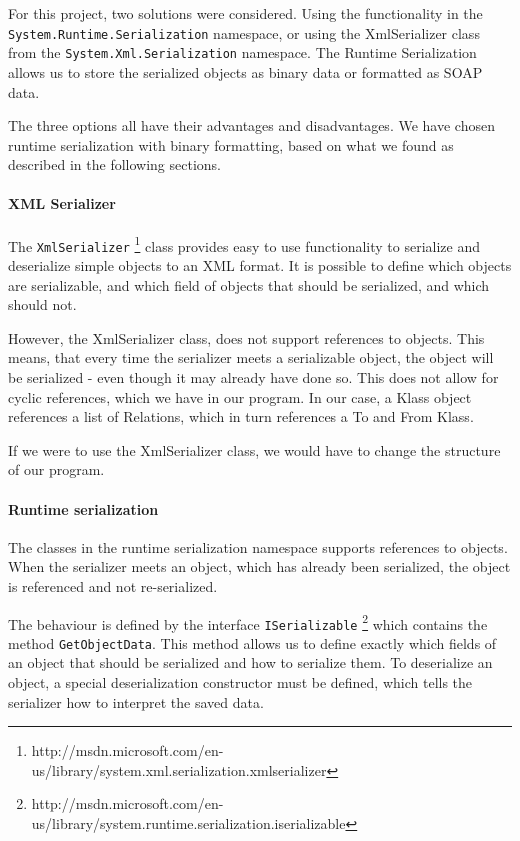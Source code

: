 For this project, two solutions were considered. Using the functionality in the
\texttt{System.Runtime.Serialization} namespace, or using the XmlSerializer
class from the \texttt{System.Xml.Serialization} namespace. The Runtime
Serialization allows us to store the serialized objects as binary data or
formatted as SOAP data.

The three options all have their advantages and disadvantages. We have chosen
runtime serialization with binary formatting, based on what we found as
described in the following sections.

\paragraph{XML Serializer}

The \texttt{XmlSerializer}
\footnote{http://msdn.microsoft.com/en-us/library/system.xml.serialization.xmlserializer} 
class provides easy to use
functionality to serialize and deserialize simple objects to an XML format. It
is possible to define which objects are serializable, and which field of objects
that should be serialized, and which should not.

However, the XmlSerializer class, does not support references to objects. This
means, that every time the serializer meets a serializable object, the object
will be serialized - even though it may already have done so. This does not
allow for cyclic references, which we have in our program. In our case, a Klass
object references a list of Relations, which in turn references a To and From
Klass.

If we were to use the XmlSerializer class, we would have to change the structure
of our program.

\paragraph{Runtime serialization}

The classes in the runtime serialization
namespace supports references to objects. When the serializer meets an object,
which has already been serialized, the object is referenced and not
re-serialized.

The behaviour is defined by the interface \texttt{ISerializable}
\footnote{http://msdn.microsoft.com/en-us/library/system.runtime.serialization.iserializable}
which contains the method \texttt{GetObjectData}. This method allows us to 
define exactly which fields of an object that should be serialized and how to 
serialize them. To deserialize an object, a special deserialization constructor 
must be defined, which tells the serializer how to interpret the saved data.

